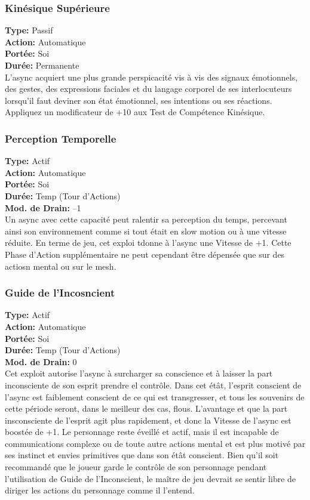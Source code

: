 \subsubsection{Kinésique Supérieure} \textbf{Type:} Passif \\ \textbf{Action:} Automatique \\ \textbf{Portée:} Soi \\ \textbf{Durée:} Permanente \\ L'async acquiert une plus grande perspicacité vis à vis des signaux émotionnels, des gestes, des expressions faciales et du langage corporel de ses interlocuteurs lorsqu'il faut deviner son état émotionnel, ses intentions ou ses réactions. Appliquez un modificateur de +10 aux Test de Compétence Kinésique. 

\subsubsection{Perception Temporelle} \textbf{Type:} Actif \\ \textbf{Action:} Automatique \\ \textbf{Portée:} Soi \\ \textbf{Durée:} Temp (Tour d'Actions) \\ \textbf{Mod. de Drain:} –1 \\ Un async avec cette capacité peut ralentir sa perception du temps, percevant ainsi son environnement comme si tout était en slow motion ou à une vitesse réduite. En terme de jeu, cet exploi tdonne à l'async une Vitesse de +1. Cette Phase d'Action supplémentaire ne peut cependant être dépensée que sur des actiosn mental ou sur le mesh. 

\subsubsection{Guide de l'Incosncient} \textbf{Type:} Actif \\ \textbf{Action:} Automatique \\ \textbf{Portée:} Soi \\ \textbf{Durée:} Temp (Tour d'Actions) \\ \textbf{Mod. de Drain:} 0 \\ Cet exploit autorise l'async à surcharger sa conscience et à laisser la part inconsciente de son esprit prendre el contrôle. Dans cet étât, l'esprit conscient de l'async est faiblement conscient de ce qui est transgresser, et tous les souvenirs de cette période seront, dans le meilleur des cas, flous. L'avantage et que la part insconsciente de l'esprit agit plus rapidement, et donc la Vitesse de l'async est boostée de +1. Le personnage reste éveillé et actif, mais il est incapable de communications complexe ou de toute autre actions mental et est plus motivé par ses instinct et envies primitives que dans son étât conscient. Bien qu'il soit recommandé que le joueur garde le contrôle de son personnage pendant l'utilisation de Guide de l'Inconscient, le maître de jeu devrait se sentir libre de diriger les actions du personnage comme il l'entend. 



